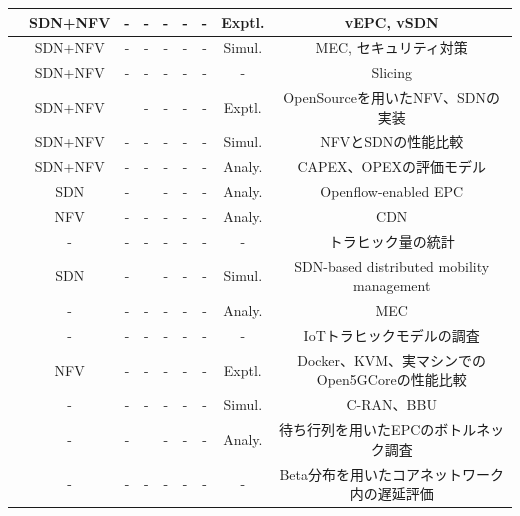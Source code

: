 \documentclass[a4j]{ujarticle}
\begin{document}
\begin{landscape}
\begin{table}[htbp]
{\begin{tabular}{c||c|cc|ccc|c|c}
		\cite{IntegratedSDN/NFVOrchestrationfortheDynamicDeploymentofMobileVirtualBackhaulNetworksOveraMultilayer(packet/optical)AggregationInfrastructure}&SDN+NFV&-&-&-&-&-&Exptl.&vEPC, vSDN \\ \hline
		\cite{NetworkServiceChaininginFogandCloudComputingforthe5GEnvironment:DataManagementandSecurityChallenges}&SDN+NFV&-&-&-&-&-&Simul.&MEC, セキュリティ対策 \\ \hline
		\cite{NetworkSlicingfor5GwithSDNNFVConceptsArchitecturesandChallenges}&SDN+NFV&-&-&-&-&-&-&Slicing \\ \hline
		\cite{AComparisonofSDNandNFVforRedesigningtheLTEPacketCore}&SDN+NFV&\Checkmark&-&-&-&-&Exptl.&OpenSourceを用いたNFV、SDNの実装 \\ \hline
		\cite{TowardsaCostOptimalDesignfora5GMobileCoreNetworkBasedonSDNandNFV}&SDN+NFV&-&-&-&-&-&Simul.&NFVとSDNの性能比較\\ \hline
	 	\cite{CostModelingforSDN/NFVBasedMobile5GNetworks}&SDN+NFV&-&-&-&-&-&Analy.&CAPEX、OPEXの評価モデル\\ \hline
 		\cite{ProposalandEvaluationofSDN‐basedMobilePacketCoreNetworks}&SDN&-&\Checkmark&-&-&-&Analy.&Openflow-enabled EPC \\ \hline
		\cite{SlicingVirtualizedEPCbased5GCoreNetworkforContentDelivery}&NFV&-&-&-&-&-&Analy.&CDN \\ \hline
		\cite{Signalingisgrowing50fasterthandatatraffic}&-&-&-&-&-&-&-&トラヒック量の統計\\ \hline
		\cite{ASDNBasedDistributedMobilityManagementinLTEEPCNetwork}&SDN&-&\Checkmark&-&-&-&Simul.&SDN-based distributed mobility management\\ \hline
		\cite{OptimizingServiceReplicationforMobileDelaySensitiveApplicationsin5GEdgeNetwork}&-&-&-&-&-&-&Analy.&MEC\\ \hline
		\cite{IoTTrafficModelsfor5GResearches}&-&-&-&-&-&-&-&IoTトラヒックモデルの調査\\ \hline
		\cite{PerformanceEvaluationofOpen5GCoreoverKVMandDockerbyUsingOpen5GMTC}&NFV&-&-&-&-&-&Exptl.&Docker、KVM、実マシンでのOpen5GCoreの性能比較\\ \hline
		\cite{PerformanceAnalysisofVNFsforSizingCloudRANInfrastructures}&-&-&-&-&-&-&Simul.&C-RAN、BBU\\ \hline
		\cite{UnderstandingtheBottlenecksinVirtualizingCellularCoreNetworkFunctions}&-&-&\Checkmark&-&-&-&Analy.&待ち行列を用いたEPCのボトルネック調査\\ \hline
		\cite{Beta/M/1ModelforMachineTypeCommunication}&-&-&-&-&-&-&-&Beta分布を用いたコアネットワーク内の遅延評価\\ \hline

\end{tabular}}
\end{table}
\end{landscape}
\end{document}
